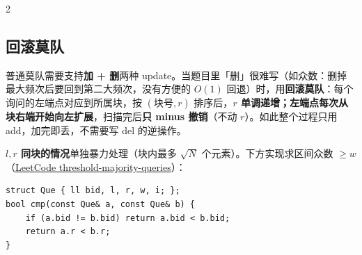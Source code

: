 \begin{multicols*}{2}
		\subsection{回滚莫队}

		普通莫队需要支持\textbf{加 + 删}两种 update。当题目里「删」很难写（如众数：删掉最大频次后要回到第二大频次，没有方便的 $O(1)$ 回退）时，用\textbf{回滚莫队}：每个询问的左端点对应到所属块，按 $(\text{块号}, r)$ 排序后，\textbf{$r$ 单调递增；左端点每次从块右端开始向左扩展}，扫描完后\textbf{只 minus 撤销}（不动 $r$）。如此整个过程只用 add，加完即丢，不需要写 del 的逆操作。

		\textbf{$l, r$ 同块的情况}单独暴力处理（块内最多 $\sqrt{N}$ 个元素）。下方实现求区间众数 $\ge w$（\href{https://leetcode.cn/problems/threshold-majority-queries/submissions/649550425/}{LeetCode threshold-majority-queries}）：

		\begin{verbatim}
struct Que { ll bid, l, r, w, i; };
bool cmp(const Que& a, const Que& b) {
    if (a.bid != b.bid) return a.bid < b.bid;
    return a.r < b.r;
}


\end{verbatim}
\end{multicols*}
